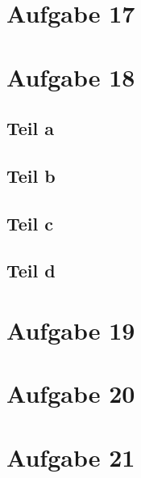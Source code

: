 \documentclass[10pt,a4paper]{article}
\begin{document}
\section{Aufgabe 17}

\section{Aufgabe 18}

\subsection{Teil a}

\subsection{Teil b}

\subsection{Teil c}

\subsection{Teil d}

\section{Aufgabe 19}

\section{Aufgabe 20}

\section{Aufgabe 21}
\end{document}
